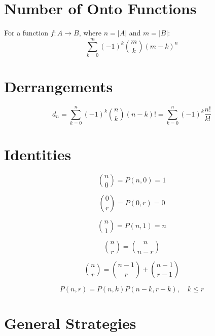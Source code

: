 \documentclass{article}
\begin{document}
    \section{Number of Onto Functions}

    For a function $f : A \to B$, where $n = |A|$ and $m = |B|$: \begin{equation}
        \sum_{k = 0}^m{(-1)^k{m \choose k}(m - k)^n}
    \end{equation}

    \section{Derrangements}

    \begin{equation}
        d_n = \sum_{k = 0}^n{(-1)^k{n \choose k}(n - k)!} = \sum_{k = 0}^n{(-1)^k\frac{n!}{k!}}
    \end{equation}

    \section{Identities}
    
    \begin{equation}
        {n \choose 0} = P(n, 0) = 1
    \end{equation}

    \begin{equation}
        {0 \choose r} = P(0, r) = 0
    \end{equation}
    
    \begin{equation}
        {n \choose 1} = P(n, 1) = n
    \end{equation}
    
    \begin{equation}
        {n \choose r} = {n \choose n - r}
    \end{equation}

    \begin{equation}
        {n \choose r} = {n - 1 \choose r} + {n - 1 \choose r - 1}
    \end{equation}

    \begin{equation}
        P(n, r) = P(n, k)P(n - k, r - k), \quad k \leq r
    \end{equation}

    \section{General Strategies}
\end{document}
